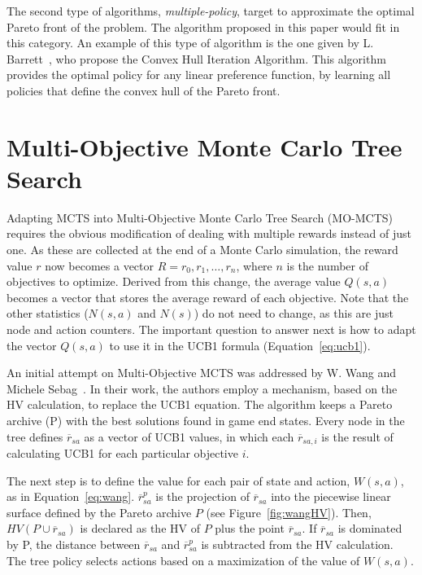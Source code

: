 \documentclass[journal]{IEEEtran}
\begin{document}
The second type of algorithms, \textit{multiple-policy}, target to approximate the optimal Pareto front of the problem. The algorithm proposed in this paper would fit in this category. An example of this type of algorithm is the one given by L. Barrett~\cite{Barrett2008}, who propose the Convex Hull Iteration Algorithm. This algorithm provides the optimal policy for any linear preference function, by learning all policies that define the convex hull of the Pareto front.

\section{Multi-Objective Monte Carlo Tree Search} \label{sec:momcts}

Adapting MCTS into Multi-Objective Monte Carlo Tree Search (MO-MCTS) requires the obvious modification of dealing with multiple rewards instead of just one. As these are collected at the end of a Monte Carlo simulation, the reward value $r$ now becomes a vector $R = {r_0, r_1, \dots, r_n}$, where $n$ is the number of objectives to optimize. Derived from this change, the average value $Q(s,a)$ becomes a vector that stores the average reward of each objective. Note that the other statistics ($N(s,a)$ and $N(s)$) do not need to change, as this are just node and action counters. The important question to answer next is how to adapt the vector $Q(s,a)$ to use it in the UCB1 formula (Equation~\ref{eq:ucb1}). 

An initial attempt on Multi-Objective MCTS was addressed by W. Wang and Michele Sebag~\cite{Weijia2012, Weijia2013}. In their work, the authors employ a mechanism, based on the HV calculation, to replace the UCB1 equation. The algorithm keeps a Pareto archive (P) with the best solutions found in game end states. Every node in the tree defines $\overline{r}_{sa}$ as a vector of UCB1 values, in which each $\overline{r}_{sa, i}$ is the result of calculating UCB1 for each particular objective $i$.

The next step is to define the value for each pair of state and action, $W(s,a)$, as in Equation~\ref{eq:wang}. $\overline{r}^p_{sa}$ is the projection of $\overline{r}_{sa}$ into the piecewise linear surface defined by the Pareto archive $P$ (see Figure~\ref{fig:wangHV}). Then, $HV(P \cup \overline{r}_{sa})$ is declared as the HV of $P$ plus the point $\overline{r}_{sa}$. If $\overline{r}_{sa}$ is dominated by P, the distance between $\overline{r}_{sa}$ and $\overline{r}^p_{sa}$ is subtracted from the HV calculation. The tree policy selects actions based on a maximization of the value of $W(s,a)$.
\end{document}

